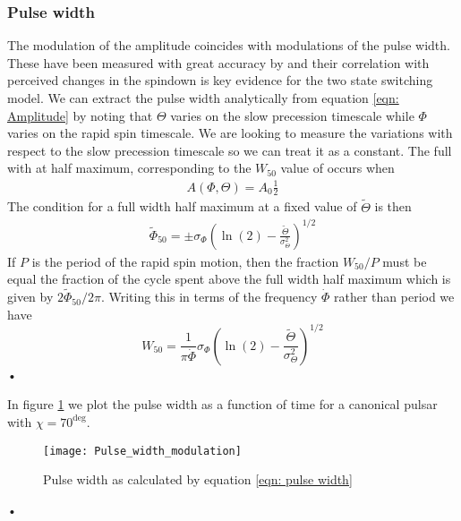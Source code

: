 \documentclass[/home/greg/Thesis/main/main.tex]{subfiles}
\begin{document}
\subsubsection{Pulse width}
The modulation of the amplitude coincides with modulations of the pulse width.
These have been measured with great accuracy by \citet{Lyne2010} and their
correlation with perceived changes in the spindown is key evidence for the two
state switching model. We can extract the pulse width analytically from
equation \eqref{eqn: Amplitude} by noting that $\Theta$ varies on the slow
precession timescale while $\Phi$ varies on the rapid spin timescale. We are
looking to measure the variations with respect to the slow precession timescale
so we can treat it as a constant. The full with at half maximum, corresponding
to the $W_{50}$ value of \citet{Lyne2010} occurs when
\begin{align}
A(\Phi, \Theta) = A_{0} \frac{1}{2} 
\end{align}
The condition for a full width half maximum at a fixed value of $\tilde{\Theta}$ 
is then
\begin{align}
\tilde{\Phi}_{50} = \pm\sigma_{\Phi}\left(\ln(2) 
          - \frac{\tilde{\Theta}}{\sigma_{\Theta}^{2}}\right)^{1/2}
\end{align}
If $P$ is the period of the rapid spin motion, then the fraction $W_{50}/P$
must be equal the fraction of the cycle spent above the full width half maximum
which is given by $2\tilde{\Phi}_{50} / 2\pi$. Writing this in terms of the
frequency $\dot{\Phi}$ rather than period we have
\begin{equation}
W_{50} = \frac{1}{\pi\dot\Phi}\sigma_{\Phi}\left(\ln(2) 
     - \frac{\tilde{\Theta}}{\sigma_{\Theta}^{2}}\right)^{1/2}
\label{eqn: pulse width}
\end{equation}•

In figure \ref{fig: PulseWidthModulation} we plot the pulse width as a function
of time for a canonical pulsar with $\chi=70^{\deg}$. 
\begin{figure}[ht]
\centering
\texttt{[image: Pulse\_width\_modulation]}
\caption{Pulse width as calculated by equation \eqref{eqn: pulse width} }
\label{fig: PulseWidthModulation}
\end{figure}•

\FloatBarrier
\end{document}
